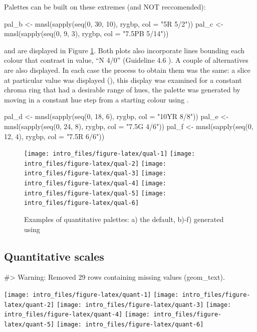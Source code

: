 Palettes can be built on these extremes (and NOT reccomended):

\begin{Schunk}
\begin{Sinput}
pal_b <- mnsl(sapply(seq(0, 30, 10), rygbp, col = "5R 5/2"))
pal_c <- mnsl(sapply(seq(0, 9, 3), rygbp, col = "7.5PB 5/14"))
\end{Sinput}
\end{Schunk}

and are displayed in Figure \ref{fig:qual}. Both plots also incorporate
lines bounding each colour that contrast in value, ``N 4/0'' (Guideline
4.6 \citet{Ware:2013aa}). A couple of alternatives are also displayed.
In each case the process to obtain them was the same: a slice at
particular value was displayed (), this display was
examined for a constant chroma ring that had a desirable range of hues,
the palette was generated by moving in a constant hue step from a
starting colour using .

\begin{Schunk}
\begin{Sinput}
pal_d <- mnsl(sapply(seq(0, 18, 6), rygbp, col = "10YR 8/8"))
pal_e <- mnsl(sapply(seq(0, 24, 8), rygbp, col = "7.5G 4/6"))
pal_f <- mnsl(sapply(seq(0, 12, 4), rygbp, col = "7.5R 6/6"))
\end{Sinput}
\end{Schunk}

\begin{Schunk}
\begin{figure}
\texttt{[image: intro\_files/figure-latex/qual-1]} \texttt{[image: intro\_files/figure-latex/qual-2]} \texttt{[image: intro\_files/figure-latex/qual-3]} \texttt{[image: intro\_files/figure-latex/qual-4]} \texttt{[image: intro\_files/figure-latex/qual-5]} \texttt{[image: intro\_files/figure-latex/qual-6]} \caption[Examples of quantitative palettes]{Examples of quantitative palettes: a) the  default, b)-f) generated using }\label{fig:qual}
\end{figure}
\end{Schunk}

\subsection{Quantitative scales}\label{quantitative-scales}

\begin{Schunk}
\begin{Soutput}
#> Warning: Removed 29 rows containing missing values (geom_text).
\end{Soutput}

\texttt{[image: intro\_files/figure-latex/quant-1]} \texttt{[image: intro\_files/figure-latex/quant-2]} \texttt{[image: intro\_files/figure-latex/quant-3]} \texttt{[image: intro\_files/figure-latex/quant-4]} \texttt{[image: intro\_files/figure-latex/quant-5]} \texttt{[image: intro\_files/figure-latex/quant-6]} \end{Schunk}

